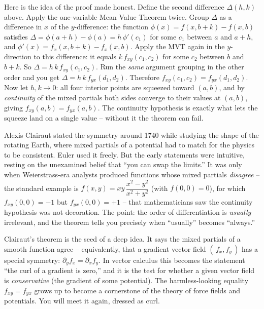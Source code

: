 \begin{whybox}
Here is the idea of the proof made honest. Define the second difference $\Delta(h,k)$ above.
Apply the one-variable Mean Value Theorem twice. Group $\Delta$ as a difference in $x$ of the
$y$-difference: the function
$\phi(x)=f(x,b+k)-f(x,b)$ satisfies $\Delta = \phi(a+h)-\phi(a) = h\,\phi'(c_1)$ for some $c_1$
between $a$ and $a+h$, and $\phi'(x)=f_x(x,b+k)-f_x(x,b)$. Apply the MVT again in the
$y$-direction to this difference: it equals $k\,f_{xy}(c_1,c_2)$ for some $c_2$ between $b$ and
$b+k$. So $\Delta = h\,k\,f_{xy}(c_1,c_2)$. Run the \emph{same} argument grouping in the other
order and you get $\Delta = h\,k\,f_{yx}(d_1,d_2)$. Therefore
$f_{xy}(c_1,c_2) = f_{yx}(d_1,d_2)$. Now let $h,k\to 0$: all four interior points are squeezed
toward $(a,b)$, and by \emph{continuity} of the mixed partials both sides converge to their
values at $(a,b)$, giving $f_{xy}(a,b)=f_{yx}(a,b)$. The continuity hypothesis is exactly what
lets the squeeze land on a single value -- without it the theorem can fail.
\end{whybox}

\begin{historybox}
Alexis Clairaut stated the symmetry around 1740 while studying the shape of the rotating Earth,
where mixed partials of a potential had to match for the physics to be consistent. Euler used it
freely. But the early statements were intuitive, resting on the unexamined belief that ``you can
swap the limits.'' It was only when Weierstrass-era analysts produced functions whose mixed
partials \emph{disagree} -- the standard example is $f(x,y)=xy\,\dfrac{x^2-y^2}{x^2+y^2}$ (with
$f(0,0)=0$), for which $f_{xy}(0,0)=-1$ but $f_{yx}(0,0)=+1$ -- that mathematicians saw the
continuity hypothesis was not decoration. The point: the order of differentiation is
\emph{usually} irrelevant, and the theorem tells you precisely when ``usually'' becomes
``always.''
\end{historybox}

\begin{connectionbox}
Clairaut's theorem is the seed of a deep idea. It says the mixed partials of a smooth function
agree -- equivalently, that a gradient vector field $(\,f_x, f_y\,)$ has a special symmetry:
$\partial_y f_x = \partial_x f_y$. In vector calculus this becomes the statement
``the curl of a gradient is zero,'' and it is the test for whether a given vector field is
\emph{conservative} (the gradient of some potential). The harmless-looking equality
$f_{xy}=f_{yx}$ grows up to become a cornerstone of the theory of force fields and potentials.
You will meet it again, dressed as curl.
\end{connectionbox}

